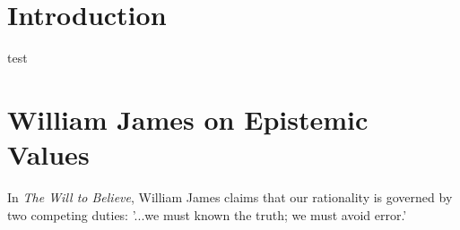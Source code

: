 \section{Introduction}
test
\section{William James on Epistemic Values}

In \emph{The Will to Believe}, William James claims that our rationality is governed by two competing duties: '...we must known the truth; we must avoid error.'